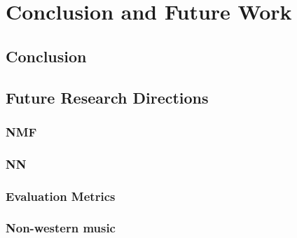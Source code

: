 \chapter{Conclusion and Future Work}
\label{ch:concl}

\section{Conclusion}

\lipsum[1-3]

\section{Future Research Directions}

\lipsum[4]

\subsection{NMF}

\lipsum[5]

\subsection{NN}

\lipsum[6]

\subsection{Evaluation Metrics}

\lipsum[7]

\subsection{Non-western music}

\lipsum[8]

\vspace{2em}

